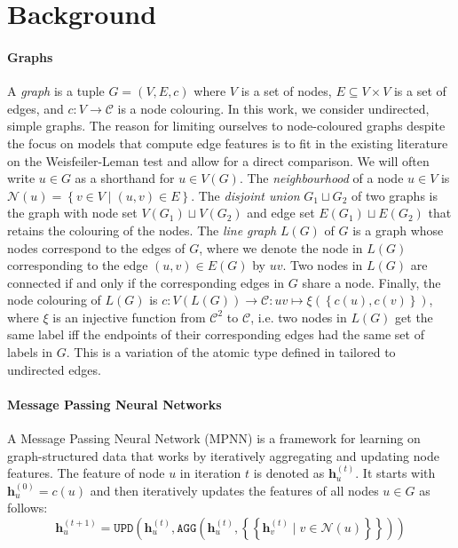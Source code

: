 \documentclass{article}
\newcommand{\set}[1]{\left\{#1\right\}}
\newcommand{\multiset}[1]{\left\{\!\!\left\{#1\right\}\!\!\right\}}
\newcommand{\iter}[1]{^{(#1)}}
\newcommand{\upd}{\texttt{UPD}}
\newcommand{\agg}{\texttt{AGG}}
\newcommand{\initdec}{\xi}
\newcommand{\nbh}{\mathcal{N}}
\newcommand{\bs}[1]{\boldsymbol{#1}}
\newcommand{\feat}{\bs{h}}
\newcommand{\mcc}{\mathcal{C}}
\begin{document}
\section{Background}    \label{sec:background}

\paragraph{Graphs}
A \emph{graph} is a tuple $G=(V,E,c)$ where $V$ is a set of nodes, $E\subseteq V\times V$ is a set of edges, and $c: V\rightarrow\mcc$ is a node colouring. In this work, we consider undirected, simple graphs.
The reason for limiting ourselves to node-coloured graphs despite the focus on models that compute edge features is to fit in the existing literature on the Weisfeiler-Leman test and allow for a direct comparison. We will often write $u\in G$ as a shorthand for $u\in V(G)$.
The \emph{neighbourhood} of a node $u\in V$ is $\nbh(u) = \set{v\in V \mid (u,v)\in E}$. The \emph{disjoint union} $G_1 \sqcup G_2$ of two graphs is the graph with node set $V(G_1) \sqcup V(G_2)$ and edge set $E(G_1) \sqcup E(G_2)$ that retains the colouring of the nodes.
The \emph{line graph} $L(G)$ of $G$ is a graph whose nodes correspond to the edges of $G$, where we denote the node in $L(G)$ corresponding to the edge $(u,v)\in E(G)$ by $uv$. Two nodes in $L(G)$ are connected if and only if the corresponding edges in $G$ share a node. Finally, the node colouring of $L(G)$ is $c: V(L(G)) \rightarrow \mcc: uv \mapsto \initdec(\set{c(u),c(v)})$, where $\initdec$ is an injective function from $\mcc^2$ to $\mcc$, i.e. two nodes in $L(G)$ get the same label iff the endpoints of their corresponding edges had the same set of labels in $G$. This is a variation of the atomic type defined in \cite{morris2019weisfeiler} tailored to undirected edges.

\paragraph{Message Passing Neural Networks}
A Message Passing Neural Network (MPNN) \cite{gilmer2017neural} is a framework for learning on graph-structured data that works by iteratively aggregating and updating node features. The feature of node $u$ in iteration $t$ is denoted as $\feat_u\iter{t}$. It starts with $\feat_u\iter{0} = c(u)$ and then iteratively updates the features of all nodes $u\in G$ as follows:
\begin{equation}
    \feat_u\iter{t+1}
    = \upd\left(\feat_u\iter{t},
    \agg\left(\feat_u\iter{t}, \multiset{\feat_v\iter{t} \mid v\in \nbh(u)}\right)\right)
\end{equation}
\end{document}
